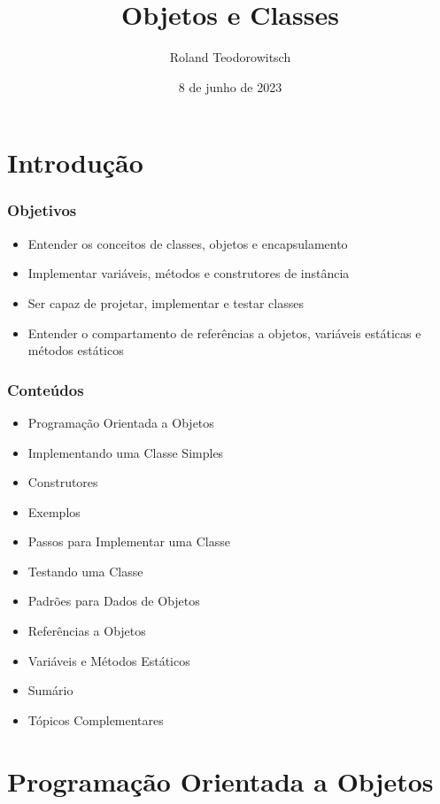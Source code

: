 \documentclass[xcolor={dvipsnames,table},aspectratio=169]{beamer}
\title[\sc{Objetos e Classes}]{Objetos e Classes}
\author[Roland Teodorowitsch]{Roland Teodorowitsch}
\institute[FPROG - EP - PUCRS]{Fundamentos de Programação - Escola Politécnica - PUCRS}
\date{8 de junho de 2023}
\begin{document}
\justifying

\begin{frame}
	\titlepage
\end{frame}

\section{Introdução}

\begin{frame}\frametitle{Objetivos}
\begin{itemize}
	\item Entender os conceitos de classes, objetos e encapsulamento
	\item Implementar variáveis, métodos e construtores de instância
	\item Ser capaz de projetar, implementar e testar classes
	\item Entender o compartamento de referências a objetos, variáveis estáticas e métodos estáticos
\end{itemize}
\end{frame}

\begin{frame}\frametitle{Conteúdos}
\begin{itemize}
	\item Programação Orientada a Objetos
	\item Implementando uma Classe Simples
	\item Construtores
	\item Exemplos
	\item Passos para Implementar uma Classe

	\item Testando uma Classe
	\item Padrões para Dados de Objetos
	\item Referências a Objetos
	\item Variáveis e Métodos Estáticos
	\item Sumário
	\item Tópicos Complementares
\end{itemize}
\end{frame}

\section{Programação Orientada a Objetos}
\end{document}
